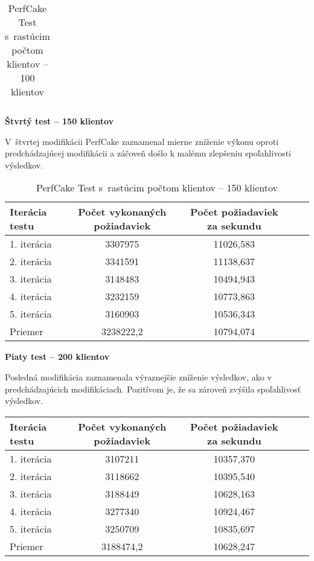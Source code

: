 \documentclass[12pt,oneside,final]{fithesis-utf8}
\begin{document}
\begin{itemize}
\begin{table}[H]
\begin{center}
\begin{tabular}{ | l | c | c | c | c |}
\end{tabular}
\end{center}
\caption{PerfCake Test s~rastúcim počtom klientov -- 100 klientov}
\end{table}


\textbf{Štvrtý test -- 150 klientov}

V~štvrtej modifikácii PerfCake zaznamenal mierne zníženie výkonu oproti predchádzajúcej modifikácii a záčoveň došlo k malému zlepšeniu spoľahlivosti výsledkov.

\begin{table}[H]
\begin{center}
\begin{tabular}{ | l | c | c | c | c |}
		\hline
		 \textbf{Iterácia testu} & \textbf{Počet vykonaných požiadaviek} & \textbf{Počet požiadaviek za sekundu} \\ \hline
		 1. iterácia & 3307975 & 11026,583 \\ \hline
		 2. iterácia & 3341591 & 11138,637 \\ \hline
		 3. iterácia & 3148483 & 10494,943 \\ \hline
		 4. iterácia & 3232159 & 10773,863 \\ \hline
		 5. iterácia & 3160903 & 10536,343 \\ \hline
		 Priemer & 3238222,2 & 10794,074 \\ \hline
		 
\end{tabular}
\end{center}
\caption{PerfCake Test s~rastúcim počtom klientov -- 150 klientov}
\end{table}

\textbf{Piaty test -- 200 klientov}

Posledná modifikácia zaznamenala výraznejšie zníženie výsledkov, ako v predchádzajúcich modifikáciach. Pozitívom je, že sa zároveň zvýšila spoľahlivosť výsledkov.

\begin{table}[H]
\begin{center}
\begin{tabular}{ | l | c | c | c | c |}
		\hline
		 \textbf{Iterácia testu} & \textbf{Počet vykonaných požiadaviek} & \textbf{Počet požiadaviek za sekundu} \\ \hline
		 1. iterácia & 3107211 & 10357,370 \\ \hline
		 2. iterácia & 3118662 & 10395,540 \\ \hline
		 3. iterácia & 3188449 & 10628,163 \\ \hline
		 4. iterácia & 3277340 & 10924,467 \\ \hline
		 5. iterácia & 3250709 & 10835,697 \\ \hline
		 Priemer & 3188474,2 & 10628,247 \\ \hline
		 

\end{tabular}
\end{center}
\end{table}
\end{itemize}
\end{document}
